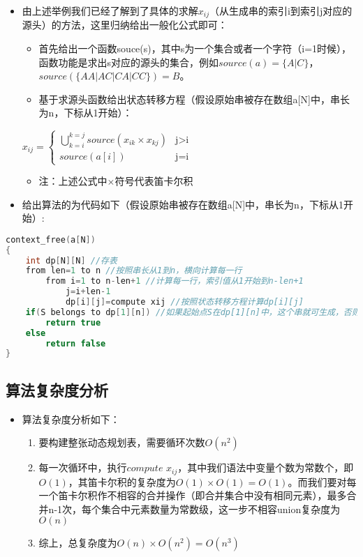 \begin{itemize}
\item
  由上述举例我们已经了解到了具体的求解\(x_{ij}\)（从生成串的索引i到索引j对应的源头）的方法，这里归纳给出一般化公式即可：

  \begin{itemize}
  \item
    首先给出一个函数souce(s)，其中s为一个集合或者一个字符（i=1时候），函数功能是求出s对应的源头的集合，例如\(source(a)=\{A|C\}\)，\(source(\{AA|AC|CA|CC\})={B}\)。
  \item
    基于求源头函数给出状态转移方程（假设原始串被存在数组a{[}N{]}中，串长为n，下标从1开始）：
  \end{itemize}

  \(x_{ij}=\begin{cases}\bigcup_{k=i}^{k=j}source(x_{ik}\times x_{kj})& \text{j>i}\\source(a[i])& \text{j=i}\end{cases}\)

  \begin{itemize}
  \item
    注：上述公式中\(\times\)符号代表笛卡尔积
  \end{itemize}
\item
  给出算法的为代码如下（假设原始串被存在数组a{[}N{]}中，串长为n，下标从1开始）:
\end{itemize}

\begin{lstlisting}[language = C++, caption = 算法伪代码]
context_free(a[N])
{
    int dp[N][N] //存表
    from len=1 to n //按照串长从1到n，横向计算每一行
        from i=1 to n-len+1 //计算每一行，索引值从1开始到n-len+1
            j=i+len-1
            dp[i][j]=compute xij //按照状态转移方程计算dp[i][j]
    if(S belongs to dp[1][n]) //如果起始点S在dp[1][n]中，这个串就可生成，否则不能生成
        return true
    else 
        return false
}
\end{lstlisting}

\subsection{算法复杂度分析}\label{header-n1293}

\begin{itemize}
\item
  算法复杂度分析如下：

  \begin{enumerate}
  \def\labelenumi{\arabic{enumi}.}
  \item
    要构建整张动态规划表，需要循环次数\(O(n^2)\)
  \item
    每一次循环中，执行\(compute\)
    \(x_{ij}\)，其中我们语法中变量个数为常数个，即\(O(1)\)，其笛卡尔积的复杂度为\(O(1)\times O(1)=O(1)\)。而我们要对每一个笛卡尔积作不相容的合并操作（即合并集合中没有相同元素），最多合并n-1次，每个集合中元素数量为常数级，这一步不相容union复杂度为\(O(n)\)
  \item
    综上，总复杂度为\(O(n)\times O(n^2)=O(n^3)\)
  \end{enumerate}
\end{itemize}

